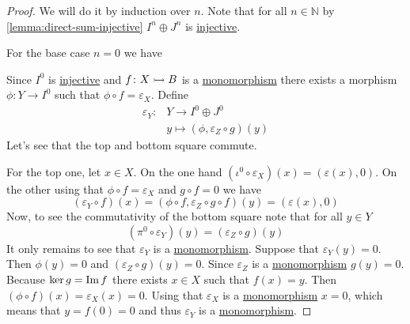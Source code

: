 \documentclass[../../main]{subfiles}
\begin{document}
\begin{proof}
  We will do it by induction over \(n\).
  Note that for all \(n \in \mathbb{N}\) by \autoref{lemma:direct-sum-injective} \(I^{n} \oplus J^{n}\) is \hyperref[def:injective-projective-object]{injective}.

  For the base case \(n = 0\) we have
  \begin{center}
  \end{center}
  Since \(I^{0}\) is \hyperref[def:injective-projective-object]{injective} and \(f\colon X \rightarrowtail B\) is a \hyperref[def:mono-epi-morphism]{monomorphism} there exists a morphism \(\phi: Y \to I^{0}\) such that \(\phi \circ f = \varepsilon_{X}\).
  Define
  \begin{align*}
    \varepsilon_{Y}\colon& Y \to I^{0} \oplus J^{0}\\
           & y \mapsto (\phi, \varepsilon_{Z} \circ g)(y)
  \end{align*}
  Let's see that the top and bottom square commute.
  
  For the top one, let \(x \in X\).
  On the one hand \(\left( \iota^{0} \circ \varepsilon_{X} \right)(x) = (\varepsilon(x), 0)\).
  On the other using that \(\phi \circ f = \varepsilon_{X}\) and \(g \circ f = 0\) we have
  \begin{equation*}
    \left( \varepsilon_{Y} \circ f \right)(x) = \left( \phi \circ f ,  \varepsilon_{Z} \circ g \circ f \right)(y) = \left( \varepsilon(x), 0 \right)
  \end{equation*}
  Now, to see the commutativity of the bottom square note that for all \(y \in Y\)
  \begin{equation*}
    \left( \pi^{0} \circ \varepsilon_{Y} \right)(y) = \left( \varepsilon_{Z} \circ g \right)(y)
  \end{equation*}
  It only remains to see that \(\varepsilon_{Y}\) is a \hyperref[def:mono-epi-morphism]{monomorphism}.
  Suppose that \(\varepsilon_{Y}(y) = 0\). Then \(\phi(y) = 0\) and \(\left( \varepsilon_{Z} \circ g \right)(y) = 0\).
  Since \(\varepsilon_{Z}\) is a \hyperref[def:mono-epi-morphism]{monomorphism} \(g(y) = 0\).
  Because \(\ker g = \operatorname*{Im} f\) there exists \(x \in X\) such that \(f(x) = y\).
  Then \(\left( \phi \circ f \right)(x) = \varepsilon_{X}(x) = 0\).
  Using that \(\varepsilon_{X}\) is a \hyperref[def:mono-epi-morphism]{monomorphism} \(x = 0\), which means that \(y = f(0) = 0\) and thus \(\varepsilon_{Y}\) is a \hyperref[def:mono-epi-morphism]{monomorphism}.


\end{proof}
\end{document}
